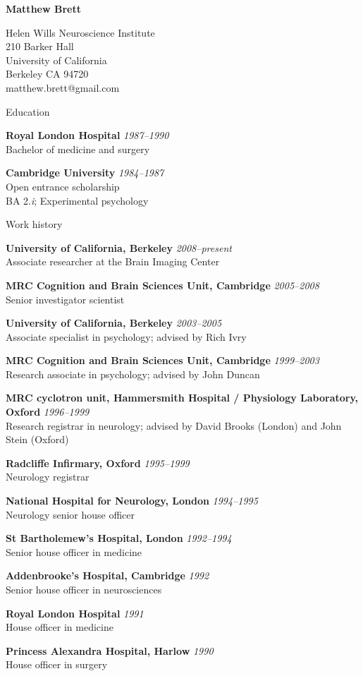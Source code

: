 \documentclass{cv}
\newcommand{\PlaceDate}[2]{{\bf #1} \hfill {\em #2} \\}
\newcommand{\PlaceDateNote}[3]{{\bf #1} \hfill {\em #2} \\#3}
\newcommand{\UCB}{University of California, Berkeley}
\newcommand{\CBU}{MRC Cognition and Brain Sciences Unit, Cambridge}
\begin{document}
\nocite{*}

{\huge \bf Matthew Brett}

Helen Wills Neuroscience Institute \\
210 Barker Hall \\
University of California \\
Berkeley CA 94720 \\
matthew.brett@gmail.com

\begin{cvSection}{Education}

\PlaceDate{Royal London Hospital}{1987--1990 }
Bachelor of medicine and surgery

\PlaceDateNote{Cambridge University}{1984--1987 }{
Open entrance scholarship \\
BA 2.{\em i}; Experimental psychology}

\end{cvSection}

\begin{cvSection}{Work history}

\PlaceDateNote{\UCB}{2008--present }{
Associate researcher at the Brain Imaging Center}

\PlaceDateNote{\CBU}{2005--2008}{
Senior investigator scientist}

\PlaceDateNote{\UCB}{2003--2005 }{
Associate specialist in psychology; advised by Rich Ivry}

\PlaceDateNote{\CBU}{1999--2003 }{
Research associate in psychology; advised by John Duncan}

\PlaceDateNote{
MRC cyclotron unit, Hammersmith Hospital / Physiology Laboratory, Oxford}
{1996--1999}
{Research registrar in neurology; advised by David Brooks (London) and John
Stein (Oxford)}

\PlaceDateNote{Radcliffe Infirmary, Oxford}
{1995--1999}
{Neurology registrar}

\PlaceDateNote{National Hospital for Neurology, London}{1994--1995 }{
Neurology senior house officer}

\PlaceDateNote{St Bartholemew's Hospital, London}{1992--1994 }{
Senior house officer in medicine}

\PlaceDateNote{Addenbrooke's Hospital, Cambridge}{1992 }{
Senior house officer in neurosciences}

\PlaceDateNote{Royal London Hospital}{1991 }{
House officer in medicine}

\PlaceDateNote{Princess Alexandra Hospital, Harlow}{1990 }{
House officer in surgery}

\end{cvSection}
\end{document}
